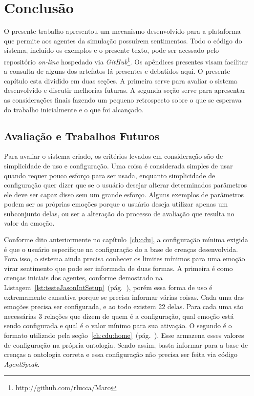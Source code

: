 \chapter{Conclusão} \label{ch:cf}

O presente trabalho apresentou um mecanismo desenvolvido para a plataforma
\jason que permite aos agentes da simulação possuírem sentimentos. Todo o
código do sistema, incluído os exemplos e o presente texto, pode ser acessado
pelo repositório \emph{on-line} hospedado via
\emph{GitHub}\footnote{http://github.com/rlucca/Maro}.
Os apêndices presentes visam facilitar a consulta de alguns dos artefatos lá
presentes e debatidos aqui.
O presente capítulo esta dividido em duas seções. A primeira serve para
avaliar o sistema desenvolvido e discutir melhorias futuras. A segunda seção
serve para apresentar as considerações finais fazendo um pequeno retrospecto
sobre o que se esperava do trabalho inicialmente e o que foi alcançado.


\section{Avaliação e Trabalhos Futuros}

Para avaliar o sistema criado, os critérios levados em consideração são de
simplicidade de uso e configuração. Uma coisa é considerada simples de usar
quando requer pouco esforço para ser usada, enquanto simplicidade de
configuração quer dizer que se o usuário desejar alterar determinados
parâmetros ele deve ser capaz disso sem um grande esforço. Alguns exemplos de
parâmetros podem ser as próprias emoções porque o usuário deseja utilizar
apenas um subconjunto delas, ou ser a alteração do processo de avaliação que
resulta no valor da emoção.

Conforme dito anteriormente no capítulo~\ref{ch:cdu}, a configuração mínima
exigida é que o usuário especifique na configuração do \jason a base de
crenças desenvolvida. Fora isso, o sistema ainda precisa conhecer os limites
mínimos para uma emoção virar sentimento que pode ser informada de duas
formas. A primeira é como crenças iniciais dos agentes, conforme demostrado na
Listagem~\ref{lst:testeJasonIntSetup}~(pág.~\pageref{lst:testeJasonIntSetup}),
porém essa forma de uso é extremamente cansativa porque se precisa informar
várias coisas. Cada uma das emoções precisa ser configurada, e ao todo existem
22 delas. Para cada uma são necessárias 3 relações que dizem de quem é a
configuração, qual emoção está sendo configurada e qual é o valor mínimo
para sua ativação. O segundo é o formato utilizado pela
seção~\ref{ch:cdu:home}~(pág.~\pageref{ch:cdu:home}). Esse armazena esses
valores de configuração na própria ontologia. Sendo assim, basta informar para
a base de crenças a ontologia correta e essa configuração não precisa ser
feita via código \emph{AgentSpeak}.

